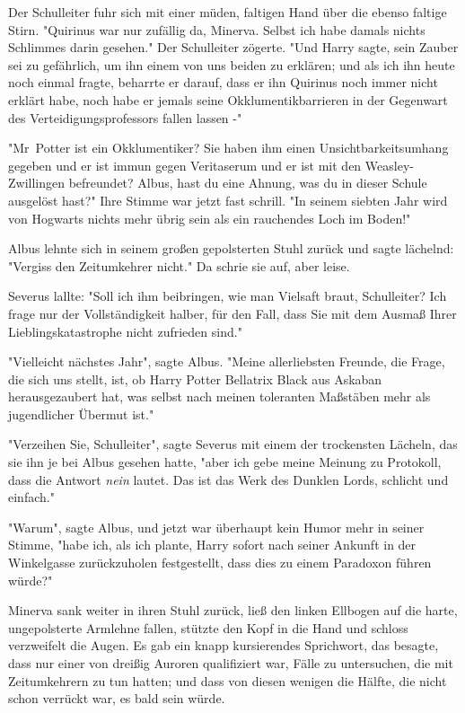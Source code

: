 {Der Schulleiter fuhr sich mit einer müden, faltigen Hand über die ebenso faltige Stirn. "Quirinus war nur zufällig da, Minerva. Selbst ich habe damals nichts Schlimmes darin gesehen." Der Schulleiter zögerte. "Und Harry sagte, sein Zauber sei zu gefährlich, um ihn einem von uns beiden zu erklären; und als ich ihn heute noch einmal fragte, beharrte er darauf, dass er ihn Quirinus noch immer nicht erklärt habe, noch habe er jemals seine Okklumentikbarrieren in der Gegenwart des Verteidigungsprofessors fallen lassen -"

"Mr~Potter ist ein Okklumentiker? Sie haben ihm einen Unsichtbarkeitsumhang gegeben und er ist immun gegen Veritaserum und er ist mit den Weasley-Zwillingen befreundet? Albus, hast du eine Ahnung, was du in dieser Schule ausgelöst hast?" Ihre Stimme war jetzt fast schrill. "In seinem siebten Jahr wird von Hogwarts nichts mehr übrig sein als ein rauchendes Loch im Boden!"

Albus lehnte sich in seinem großen gepolsterten Stuhl zurück und sagte lächelnd: "Vergiss den Zeitumkehrer nicht." Da schrie sie auf, aber leise.

Severus lallte: "Soll ich ihm beibringen, wie man Vielsaft braut, Schulleiter? Ich frage nur der Vollständigkeit halber, für den Fall, dass Sie mit dem Ausmaß Ihrer Lieblingskatastrophe nicht zufrieden sind."

"Vielleicht nächstes Jahr", sagte Albus. "Meine allerliebsten Freunde, die Frage, die sich uns stellt, ist, ob Harry Potter Bellatrix Black aus Askaban herausgezaubert hat, was selbst nach meinen toleranten Maßstäben mehr als jugendlicher Übermut ist."

"Verzeihen Sie, Schulleiter", sagte Severus mit einem der trockensten Lächeln, das sie ihn je bei Albus gesehen hatte, "aber ich gebe meine Meinung zu Protokoll, dass die Antwort \emph{nein} lautet. Das ist das Werk des Dunklen Lords, schlicht und einfach."

"Warum", sagte Albus, und jetzt war überhaupt kein Humor mehr in seiner Stimme, "habe ich, als ich plante, Harry sofort nach seiner Ankunft in der Winkelgasse zurückzuholen festgestellt, dass dies zu einem Paradoxon führen würde?"

Minerva sank weiter in ihren Stuhl zurück, ließ den linken Ellbogen auf die harte, ungepolsterte Armlehne fallen, stützte den Kopf in die Hand und schloss verzweifelt die Augen. Es gab ein knapp kursierendes Sprichwort, das besagte, dass nur einer von dreißig Auroren qualifiziert war, Fälle zu untersuchen, die mit Zeitumkehrern zu tun hatten; und dass von diesen wenigen die Hälfte, die nicht schon verrückt war, es bald sein würde.

}
